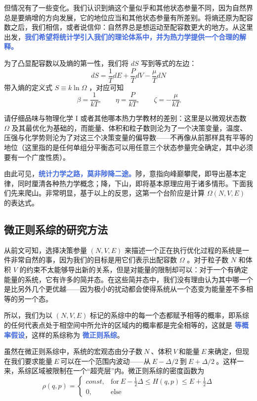 但情况有了一些变化。我们认识到熵这个量似乎和其他状态参量不同，因为自然界总是要熵增的方向发展，它的地位应当和其他状态参量有所差别。将熵还原为配容数之后，我们相信，或者说信仰：自然界总是想运动至配容数更大的地方。从这里出发，\textcolor{RoyalBlue}{\textbf{\kaishu 我们希望将统计学引入我们的理论体系中，并为热力学提供一个合理的解释。}} 

为了凸显配容数以及熵的第一性，我们将 $dS$ 写到等式的左边：
\begin{equation}
    dS = \frac{1}{T} dE + \frac{P}{T} dV - \frac{\mu}{T} dN
\end{equation}
带入熵的定义式 $S \equiv k\ln \Omega$ ，对应可知
\begin{equation}
    \beta = \frac{1}{kT} ,\quad\quad \eta = \frac{P}{kT} ,\quad\quad \zeta = -\frac{\mu}{kT} 
\end{equation}

请仔细品味与物理化学 I 或者其他哪本热力学教材的差别：这里是以微观状态数 $\Omega$ 及其最优化为基础的，而能量、体积和粒子数则沦为了一个决策变量，温度、压强与化学势则沦为了对这三个决策变量的偏导数——不再像从前那样具有平等的地位（这里指的是任何单组分平衡态可以用任意三个状态参量完全确定，其中必须要有一个广度性质）。

由此可见，\textcolor{RoyalBlue}{\textbf{\kaishu 统计力学之路，莫非陟降二途。}}陟，意指向峰巅攀爬，即导出基本定律，同时厘清各种热力学概念；降，下山，即将基本原理应用于诸多情形。下面我们先来爬山。非常明显，基于以上的反思，这第一个台阶应是计算 $\Omega (N,V,E)$ 的表达式。 


\subsection{微正则系综的研究方法}

从前文可知，选择决策参量 $(N,V,E)$ 来描述一个正在执行优化过程的系统是一件非常自然的事，因为我们的目标是用它们表示出配容数 $\Omega$ 。对于粒子数 $N$ 和体积 $V$ 的约束不太能够导出新的关系，但是对能量的限制却可以：对于一个有确定能量的系统，它有许多的简并态。在这些简并态中，我们没有理由认为其中哪一个是比另外几个更优越——因为极小的扰动都会使得系统从一个态变为能量差不多相等的另一个态。

所以，我们为以 $(N,V,E)$ 标记的系综中的每一个态都赋予相等的概率，即系综的任何代表点处于相空间中所允许的区域内的概率都是完全相等的，这就是 \textcolor{RoyalBlue}{\textbf{\kaishu 等概率假设}}，这样的系综称为 \textcolor{RoyalBlue}{\textbf{\kaishu 微正则系综}}。

虽然在微正则系综中，系统的宏观态由分子数$~N~$、体积$~V~$和能量$~E~$来确定，但现在我们要求能量$~E~$可以在一个范围内波动——从$~E -\Delta/2~$到$~E + \Delta/2~$。这样一来，系综区域被限制在一个“超壳层”内。微正则系综的密度函数为
\begin{equation}
\rho(q, p) = \begin{cases}const, & \text{for}~E - \displaystyle\frac{1}{2}\Delta \le H(q, p) \le E + \displaystyle\frac{1}{2}\Delta \\
0, &\text{else}
\end{cases}
\end{equation}

